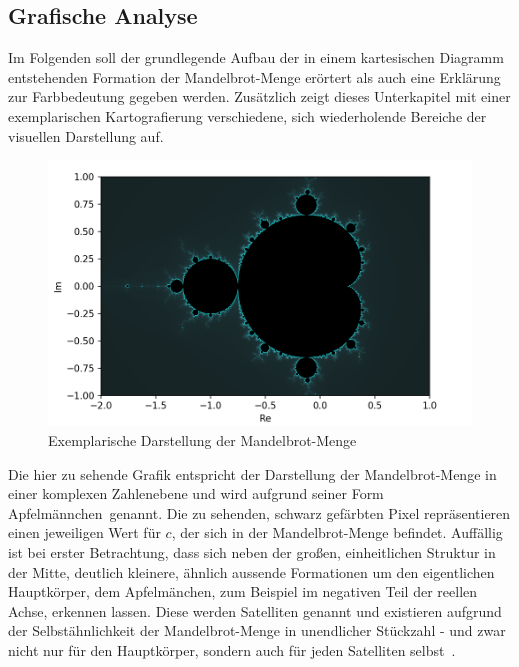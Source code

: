 \subsection{Grafische Analyse}\label{subsec:graphical-analysis}

Im Folgenden soll der grundlegende Aufbau der in einem kartesischen Diagramm
entstehenden Formation der Mandelbrot-Menge erörtert als auch eine
Erklärung zur Farbbedeutung gegeben werden.
Zusätzlich zeigt dieses Unterkapitel mit einer exemplarischen Kartografierung
verschiedene, sich wiederholende Bereiche der visuellen Darstellung auf.

\begin{figure}[h!]
  \centering
  \includegraphics[width=\textwidth]{images/mandelbrotImage}
  \caption[Caption for LOF]{
    Exemplarische Darstellung der Mandelbrot-Menge\footnotemark
  }
  \label{fig:mandelbrot-set}
\end{figure}

Die hier zu sehende Grafik entspricht der Darstellung der Mandelbrot-Menge
in einer komplexen Zahlenebene und wird aufgrund seiner Form
\glqq Apfelm\"annchen\grqq~genannt.
Die zu sehenden, schwarz gefärbten Pixel repräsentieren einen
jeweiligen Wert für $c$, der sich in der Mandelbrot-Menge befindet.
Auffällig ist bei erster Betrachtung, dass sich neben der großen,
einheitlichen Struktur in der Mitte,
deutlich kleinere, ähnlich aussende Formationen um den eigentlichen Hauptkörper,
dem Apfelm\"anchen, zum Beispiel im negativen Teil der reellen Achse,
erkennen lassen.
Diese werden Satelliten genannt und existieren aufgrund der Selbstähnlichkeit
der Mandelbrot-Menge in unendlicher Stückzahl - und zwar nicht nur für den Hauptkörper,
sondern auch für jeden Satelliten selbst~\cite{lomonaco_quasi-conformal_2018}.

